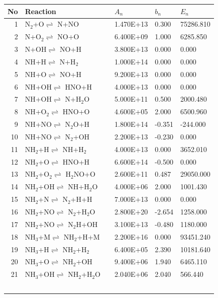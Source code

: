 \documentclass[11pt]{article}
\begin{document}
\begin{table}[hbt]
\begin{tabular}{|r l c l l l|} \hline 
No& Reaction &   & $A_n$& $b_n$ & $E_n$\\ \hline 
1 &	N$_{2}$+O$\rightleftharpoons$ N+NO&	&	1.470E+13&	0.300&	75286.810\\ 
2 &	N+O$_{2}$$\rightleftharpoons$ NO+O&	&	6.400E+09&	1.000&	6285.850\\ 
3 &	N+OH$\rightleftharpoons$ NO+H&	&	3.800E+13&	0.000&	0.000\\ 
4 &	NH+H$\rightleftharpoons$ N+H$_{2}$&	&	1.000E+14&	0.000&	0.000\\ 
5 &	NH+O$\rightleftharpoons$ NO+H&	&	9.200E+13&	0.000&	0.000\\ 
6 &	NH+OH$\rightleftharpoons$ HNO+H&	&	4.000E+13&	0.000&	0.000\\ 
7 &	NH+OH$\rightleftharpoons$ N+H$_{2}$O&	&	5.000E+11&	0.500&	2000.480\\ 
8 &	NH+O$_{2}$$\rightleftharpoons$ HNO+O&	&	4.600E+05&	2.000&	6500.960\\ 
9 &	NH+NO$\rightleftharpoons$ N$_{2}$O+H&	&	1.800E+14&	-0.351&	-244.000\\ 
10 &	NH+NO$\rightleftharpoons$ N$_{2}$+OH&	&	2.200E+13&	-0.230&	0.000\\ 
11 &	NH$_{2}$+H$\rightleftharpoons$ NH+H$_{2}$&	&	4.000E+13&	0.000&	3652.010\\ 
12 &	NH$_{2}$+O$\rightleftharpoons$ HNO+H&	&	6.600E+14&	-0.500&	0.000\\ 
13 &	NH$_{2}$+O$_{2}$$\rightleftharpoons$ H$_{2}$NO+O&	&	2.600E+11&	0.487&	29050.000\\ 
14 &	NH$_{2}$+OH$\rightleftharpoons$ NH+H$_{2}$O&	&	4.000E+06&	2.000&	1001.430\\ 
15 &	NH$_{2}$+N$\rightleftharpoons$ N$_{2}$+H+H&	&	7.000E+13&	0.000&	0.000\\ 
16 &	NH$_{2}$+NO$\rightleftharpoons$ N$_{2}$+H$_{2}$O&	&	2.800E+20&	-2.654&	1258.000\\ 
17 &	NH$_{2}$+NO$\rightleftharpoons$ N$_{2}$H+OH&	&	3.100E+13&	-0.480&	1180.000\\ 
18 &	NH$_{3}$+M$\rightleftharpoons$ NH$_{2}$+H+M&	&	2.200E+16&	0.000&	93451.240\\ 
19 &	NH$_{3}$+H$\rightleftharpoons$ NH$_{2}$+H$_{2}$&	&	6.400E+05&	2.390&	10181.640\\ 
20 &	NH$_{3}$+O$\rightleftharpoons$ NH$_{2}$+OH&	&	9.400E+06&	1.940&	6465.110\\ 
21 &	NH$_{3}$+OH$\rightleftharpoons$ NH$_{2}$+H$_{2}$O&	&	2.040E+06&	2.040&	566.440\\ 
$$
\end{tabular}
\end{table}
\end{document}
